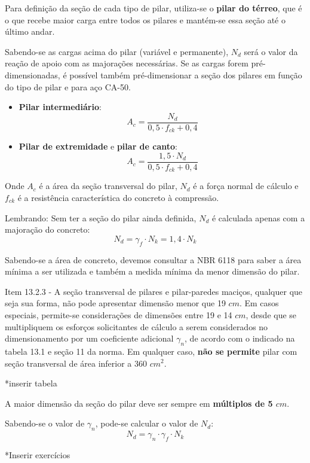 Para definição da seção de cada tipo de pilar, utiliza-se o \textbf{pilar do térreo}, que é o que recebe maior carga entre todos os pilares e mantém-se essa seção até o último andar.

Sabendo-se as cargas acima do pilar (variável e permanente), $N_d$ será o valor da reação de apoio com as majorações necessárias. Se as cargas forem pré-dimensionadas, é possível também pré-dimensionar a seção dos pilares em função do tipo de pilar e para aço CA-50.

\begin{itemize}
	\item \textbf{Pilar intermediário}:
		\begin{equation}A_c=\frac{N_d}{0,5\cdot f_{ck}+0,4}\end{equation}
	\item \textbf{Pilar de extremidade} e \textbf{pilar de canto}:
		\begin{equation}A_c=\frac{1,5\cdot N_d}{0,5\cdot f_{ck}+0,4}\end{equation}
\end{itemize}

Onde $A_c$ é a área da seção transversal do pilar, $N_d$ é a força normal de cálculo e $f_{ck}$ é a resistência característica do concreto à compressão.

Lembrando: Sem ter a seção do pilar ainda definida, $N_d$ é calculada apenas com a majoração do concreto:
\begin{equation}N_d=\gamma_f\cdot N_k=1,4\cdot N_k\end{equation}

Sabendo-se a área de concreto, devemos consultar a NBR 6118 para saber a área mínima a ser utilizada e também a medida mínima da menor dimensão do pilar.

Item 13.2.3 - A seção transversal de pilares e pilar-paredes maciços, qualquer que seja sua forma, não pode apresentar dimensão menor que 19 $cm$. Em casos especiais, permite-se considerações de dimensões entre 19 e 14 $cm$, desde que se multipliquem os esforços solicitantes de cálculo a serem considerados no dimensionamento por um coeficiente adicional $\gamma_n$, de acordo com o indicado na tabela 13.1 e seção 11 da norma. Em qualquer caso, \textbf{não se permite} pilar com seção transversal de área inferior a 360 ${cm}^2$.

*inserir tabela

A maior dimensão da seção do pilar deve ser sempre em \textbf{múltiplos de 5 $cm$}.

Sabendo-se o valor de $\gamma_n$, pode-se calcular o valor de $N_d$:
\begin{equation}N_d=\gamma_n\cdot\gamma_f\cdot N_k\end{equation}

*Inserir exercícios